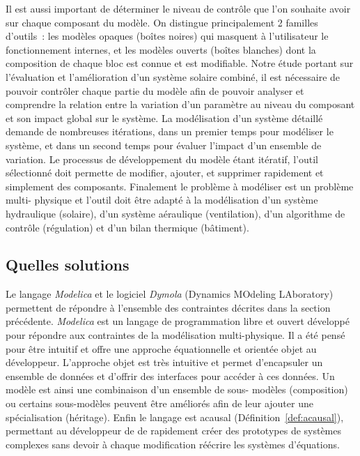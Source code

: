 Il est aussi important de déterminer le niveau de contrôle que l’on souhaite avoir sur
chaque composant du modèle. On distingue principalement 2 familles d’outils~: les modèles
opaques (boîtes noires) qui masquent à l’utilisateur le fonctionnement internes, et les
modèles ouverts (boîtes blanches) dont la composition de chaque bloc est connue et est
modifiable. Notre étude portant sur l’évaluation et l’amélioration d’un système solaire
combiné, il est nécessaire de pouvoir contrôler chaque partie du modèle afin de pouvoir
analyser et comprendre la relation entre la variation d’un paramètre au niveau du
composant et son impact global sur le système. La modélisation d’un système détaillé
demande de nombreuses itérations, dans un premier temps pour modéliser le système, et dans
un second temps pour évaluer l’impact d’un ensemble de variation. Le processus de
développement du modèle étant itératif, l’outil sélectionné doit permette de modifier,
ajouter, et supprimer rapidement et simplement des composants. Finalement le problème à
modéliser est un problème multi- physique et l’outil doit être adapté à la modélisation
d’un système hydraulique (solaire), d’un système aéraulique (ventilation), d’un algorithme
de contrôle (régulation) et d’un bilan thermique (bâtiment).



\subsection{Quelles solutions} %
\label{sub:quelles_solutions}
Le langage \textit{Modelica} et le logiciel \textit{Dymola} (Dynamics MOdeling LAboratory)
permettent de répondre à l’ensemble des contraintes décrites dans la section précédente.
\textit{Modelica} est un langage de programmation libre et ouvert développé pour répondre
aux contraintes de la modélisation multi-physique. Il a été pensé pour être intuitif et
offre une approche équationnelle et orientée objet au développeur. L’approche objet est
très intuitive et permet d’encapsuler un ensemble de données et d’offrir des interfaces
pour accéder à ces données. Un modèle est ainsi une combinaison d’un ensemble de sous-
modèles (composition) ou certains sous-modèles peuvent être améliorés afin de leur ajouter
une spécialisation (héritage). Enfin le langage est acausal
(Définition~\ref{def:acausal}), permettant au développeur de de rapidement créer des
prototypes de systèmes complexes sans devoir à chaque modification réécrire les systèmes
d’équations.


